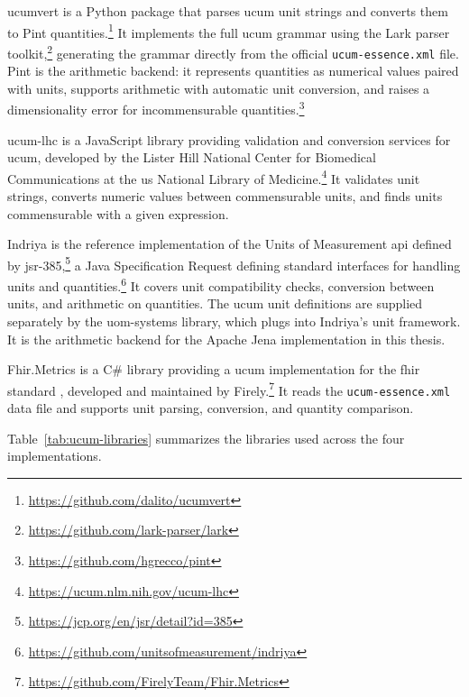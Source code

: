 ucumvert is a Python package that parses \ac{ucum} unit strings and converts them to Pint
quantities.\footnote{\url{https://github.com/dalito/ucumvert}} It implements the full
\ac{ucum} grammar using the Lark parser toolkit,\footnote{\url{https://github.com/lark-parser/lark}}
generating the grammar directly from the official \texttt{ucum-essence.xml} file. Pint is
the arithmetic backend: it represents quantities as numerical values paired with units,
supports arithmetic with automatic unit conversion, and raises a dimensionality error for
incommensurable quantities.\footnote{\url{https://github.com/hgrecco/pint}}

ucum-lhc is a JavaScript library providing validation and conversion services for
\ac{ucum}, developed by the Lister Hill National Center for Biomedical Communications at
the \ac{us} National Library of
Medicine.\footnote{\url{https://ucum.nlm.nih.gov/ucum-lhc}} It validates unit strings,
converts numeric values between commensurable units, and finds units commensurable with a
given expression.

Indriya is the reference implementation of the Units of Measurement \ac{api} defined by
\ac{jsr}-385,\footnote{\url{https://jcp.org/en/jsr/detail?id=385}} a Java Specification
Request defining standard interfaces for handling units and
quantities.\footnote{\url{https://github.com/unitsofmeasurement/indriya}} It covers unit
compatibility checks, conversion between units, and arithmetic on quantities. The \ac{ucum}
unit definitions are supplied separately by the uom-systems library, which plugs into
Indriya's unit framework. It is the arithmetic backend for the Apache Jena implementation
in this thesis.

Fhir.Metrics is a C\# library providing a \ac{ucum} implementation for the \ac{fhir}
standard \cite{hl7_fhir_quantity}, developed and maintained by
Firely.\footnote{\url{https://github.com/FirelyTeam/Fhir.Metrics}} It reads the
\texttt{ucum-essence.xml} data file and supports unit parsing, conversion, and quantity
comparison.

Table~\ref{tab:ucum-libraries} summarizes the libraries used across the four
implementations.

